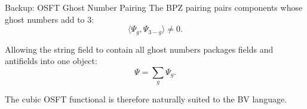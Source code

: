 \documentclass[aspectratio=169,professionalfonts]{beamer}
\begin{document}
\begin{frame}{Backup: OSFT Ghost Number Pairing}
  \small
  The BPZ pairing pairs components whose ghost numbers add to $3$:
  \[
    \langle \Psi_g,\Psi_{3-g}\rangle\neq 0 .
  \]

  Allowing the string field to contain all ghost numbers packages fields and
  antifields into one object:
  \[
    \Psi=\sum_g \Psi_g .
  \]

  The cubic OSFT functional is therefore naturally suited to the BV language.
\end{frame}
\end{document}
